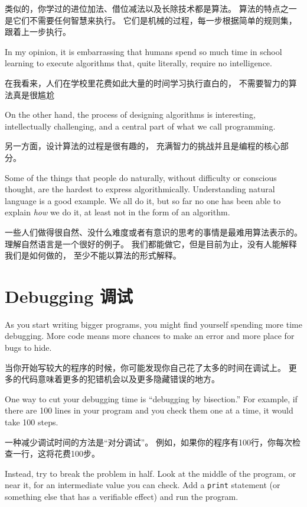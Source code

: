 \documentclass[10pt]{book}
\begin{document}
\begin{CJK}{UTF8}{gbsn}
类似的，你学过的进位加法、借位减法以及长除技术都是算法。
算法的特点之一是它们不需要任何智慧来执行。
它们是机械的过程，每一步根据简单的规则集，跟着上一步执行。

In my opinion, it is embarrassing that humans spend so much time in
school learning to execute algorithms that, quite literally, require
no intelligence.

在我看来，人们在学校里花费如此大量的时间学习执行直白的，
不需要智力的算法真是很尴尬

On the other hand, the process of designing algorithms is interesting,
intellectually challenging, and a central part of what we call
programming.

另一方面，设计算法的过程是很有趣的，
充满智力的挑战并且是编程的核心部分。

Some of the things that people do naturally, without difficulty or
conscious thought, are the hardest to express algorithmically.
Understanding natural language is a good example.  We all do it, but
so far no one has been able to explain {\em how} we do it, at least
not in the form of an algorithm.

一些人们做得很自然、没什么难度或者有意识的思考的事情是最难用算法表示的。
理解自然语言是一个很好的例子。
我们都能做它，但是目前为止，没有人能解释我们是如何做的，
至少不能以算法的形式解释。


\section{Debugging 调试}

As you start writing bigger programs, you might find yourself
spending more time debugging.  More code means more chances to
make an error and more place for bugs to hide.

当你开始写较大的程序的时候，你可能发现你自己花了太多的时间在调试上。
更多的代码意味着更多的犯错机会以及更多隐藏错误的地方。

One way to cut your debugging time is ``debugging by bisection.''
For example, if there are 100 lines in your program and you
check them one at a time, it would take 100 steps.

一种减少调试时间的方法是``对分调试''。
例如，如果你的程序有100行，你每次检查一行，这将花费100步。

Instead, try to break the problem in half.  Look at the middle
of the program, or near it, for an intermediate value you
can check.  Add a {\tt print} statement (or something else
that has a verifiable effect) and run the program.


\end{CJK}
\end{document}

